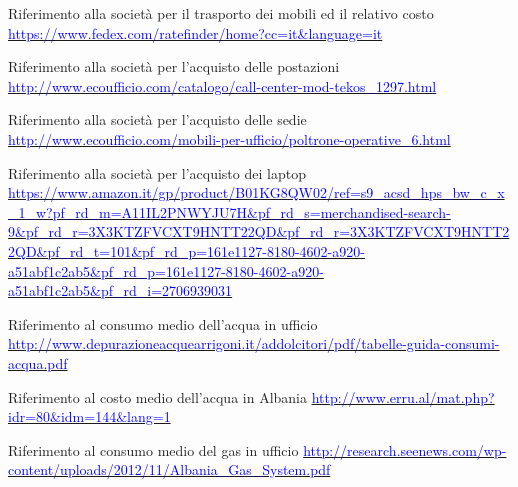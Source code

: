 \begin{thebibliography}{99}
 Riferimento alla società per il trasporto dei mobili ed il relativo costo\newline 
			\href{https://www.fedex.com/ratefinder/home?cc=it\&language=it}{\textcolor{blue}{https://www.fedex.com/ratefinder/home?cc=it\&language=it}}

 Riferimento alla società per l'acquisto delle postazioni\newline 
			\href{http://www.ecoufficio.com/catalogo/call-center-mod-tekos\_1297.html}{\textcolor{blue}{http://www.ecoufficio.com/catalogo/call-center-mod-tekos\_1297.html}}

 Riferimento alla società per l'acquisto delle sedie\newline 
			\href{http://www.ecoufficio.com/mobili-per-ufficio/poltrone-operative\_6.html}{\textcolor{blue}{http://www.ecoufficio.com/mobili-per-ufficio/poltrone-operative\_6.html}}

 Riferimento alla società per l'acquisto dei laptop\newline 
			\href{https://www.amazon.it/gp/product/B01KG8QW02/ref=s9\_acsd\_hps\_bw\_c\_x\_1\_w?pf\_rd\_m=A11IL2PNWYJU7H\&pf\_rd\_s=merchandised-search-9\&pf\_rd\_r=3X3KTZFVCXT9HNTT22QD\&pf\_rd\_r=3X3KTZFVCXT9HNTT22QD\&pf\_rd\_t=101\&pf\_rd\_p=161e1127-8180-4602-a920-a51abf1c2ab5\&pf\_rd\_p=161e1127-8180-4602-a920-a51abf1c2ab5\&pf\_rd\_i=2706939031}{\textcolor{blue}{https://www.amazon.it/gp/product/B01KG8QW02/ref=s9\_acsd\_hps\_bw\_c\_x\_1\_w?pf\_rd\_m=A11IL2PNWYJU7H\&pf\_rd\_s=merchandised-search-9\&pf\_rd\_r=3X3KTZFVCXT9HNTT22QD\&pf\_rd\_r=3X3KTZFVCXT9HNTT22QD\&pf\_rd\_t=101\&pf\_rd\_p=161e1127-8180-4602-a920-a51abf1c2ab5\&pf\_rd\_p=161e1127-8180-4602-a920-a51abf1c2ab5\&pf\_rd\_i=2706939031}}

 Riferimento al consumo medio dell'acqua in ufficio\newline 
			\href{http://www.depurazioneacquearrigoni.it/addolcitori/pdf/tabelle-guida-consumi-acqua.pdf}{\textcolor{blue}{http://www.depurazioneacquearrigoni.it/addolcitori/pdf/tabelle-guida-consumi-acqua.pdf}}

 Riferimento al costo medio dell'acqua in Albania\newline 
			\href{http://www.erru.al/mat.php?idr=80\&idm=144\&lang=1}{\textcolor{blue}{http://www.erru.al/mat.php?idr=80\&idm=144\&lang=1}}

 Riferimento al consumo medio del gas in ufficio\newline 
			\href{http://research.seenews.com/wp-content/uploads/2012/11/Albania\_Gas\_System.pdf}{\textcolor{blue}{http://research.seenews.com/wp-content/uploads/2012/11/Albania\_Gas\_System.pdf}}


\end{thebibliography}
